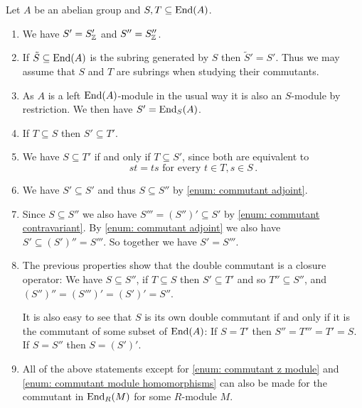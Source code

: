 \begin{remark}
  Let $A$ be an abelian group and $S, T \subseteq \operatorname{End}(A)$.
  \begin{enumerate}[label=\emph{\alph*}),leftmargin=*]
    \item \label{enum: commutant z module}
      We have $S' = S'_{\mathbb{Z}}$ and $S'' = S''_{\mathbb{Z}}$.
    \item
      If $\tilde{S} \subseteq \operatorname{End}(A)$ is the subring generated by $S$ then $\tilde{S}' = S'$.
      Thus we may assume that $S$ and $T$ are subrings when studying their commutants.
    \item \label{enum: commutant module homomorphisms}
      As $A$ is a left $\operatorname{End}(A)$-module in the usual way it is also an $S$-module by restriction.
      We then have $S' = \operatorname{End}_S(A)$.
    \item \label{enum: commutant contravariant}
      If $T \subseteq S$ then $S' \subseteq T'$.
    \item \label{enum: commutant adjoint}
      We have $S \subseteq T'$ if and only if $T \subseteq S'$, since both are equivalent to
      \[
        st = ts
        \text{ for every }
        t \in T,
        s \in S \,.
      \]
    \item
      We have $S' \subseteq S'$ and thus $S \subseteq S''$ by \ref{enum: commutant adjoint}.
    \item
      Since $S \subseteq S''$ we also have $S''' = (S'')' \subseteq S'$ by \ref{enum: commutant contravariant}.
      By \ref{enum: commutant adjoint} we also have $S' \subseteq (S')'' = S'''$.
      So together we have $S' = S'''$.
    \item
      The previous properties show that the double commutant is a closure operator:
      We have $S \subseteq S''$, if $T \subseteq S$ then $S' \subseteq T'$ and so $T'' \subseteq S''$, and $(S'')'' = (S''')' = (S')' = S''$.
      
      It is also easy to see that $S$ is its own double commutant if and only if it is the commutant of some subset of $\operatorname{End}(A)$:
      If $S = T'$ then $S'' = T''' = T' = S$.
      If $S = S''$ then $S = (S')'$.
    \item
      All of the above statements except for \ref{enum: commutant z module} and \ref{enum: commutant module homomorphisms} can also be made for the commutant in $\operatorname{End}_R(M)$ for some $R$-module $M$.
  \end{enumerate}
\end{remark}


